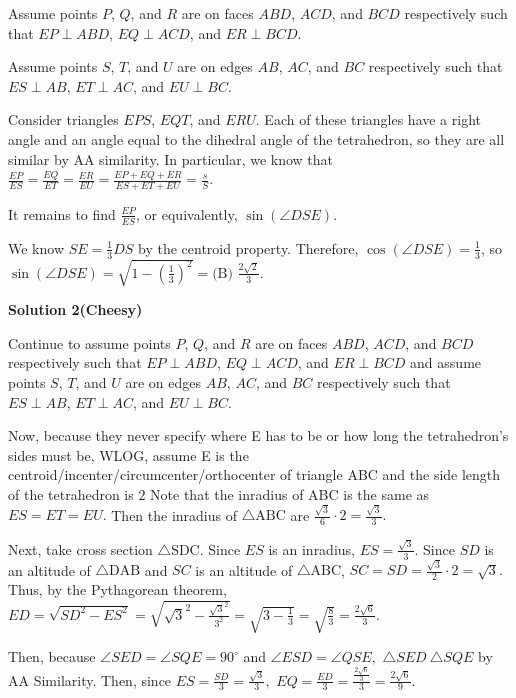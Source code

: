 \begin{enumerate}
Assume points $P$, $Q$, and $R$ are on faces $ABD$, $ACD$, and $BCD$ respectively such that $EP \perp ABD$, $EQ \perp ACD$, and $ER \perp BCD$.

 Assume points $S$, $T$, and $U$ are on edges $AB$, $AC$, and $BC$ respectively such that $ES \perp AB$, $ET \perp AC$, and $EU \perp BC$.

 Consider triangles $EPS$, $EQT$, and $ERU$. Each of these triangles have a right angle and an angle equal to the dihedral angle of the tetrahedron, so they are all similar by AA similarity. In particular, we know that $\frac{EP}{ES} = \frac{EQ}{ET} = \frac{ER}{EU} = \frac{EP+EQ+ER}{ES+ET+EU} = \frac{s}{S}$.

 It remains to find $\frac{EP}{ES}$, or equivalently, $\sin(\angle DSE)$.

 We know $SE = \frac{1}{3}DS$ by the centroid property. Therefore, $\cos(\angle DSE) = \frac{1}{3}$, so $\sin(\angle DSE) = \sqrt{1-\left(\frac{1}{3}\right)^2} = \boxed {\text{(B) }\frac{2 \sqrt{2}}{3}}$.

 



\textbf{Solution 2(Cheesy)}

Continue to assume points $P$, $Q$, and $R$ are on faces $ABD$, $ACD$, and $BCD$ respectively such that $EP \perp ABD$, $EQ \perp ACD$, and $ER \perp BCD$ and assume points $S$, $T$, and $U$ are on edges $AB$, $AC$, and $BC$ respectively such that $ES \perp AB$, $ET \perp AC$, and $EU \perp BC$. 

 Now, because they never specify where E has to be or how long the tetrahedron's sides must be, WLOG, assume E is the centroid/incenter/circumcenter/orthocenter of triangle ABC and the side length of the tetrahedron is $2$ Note that the inradius of ABC is the same as $ES=ET=EU.$ Then the inradius of $\triangle\text{ABC}$ are $\frac{\sqrt3}{6}\cdot 2=\frac{\sqrt3}{3}.$ 

 Next, take cross section $\triangle\text{SDC}.$ Since $ES$ is an inradius, $ES=\frac{\sqrt3}{3}.$ Since $SD$ is an altitude of $\triangle\text{DAB}$ and $SC$ is an altitude of $\triangle\text{ABC}$, $SC=SD=\frac{\sqrt3}{2}\cdot 2=\sqrt3.$ Thus, by the Pythagorean theorem, $ED=\sqrt{SD^2-ES^2}=\sqrt{\sqrt{3}^2-\frac{\sqrt{3}^2}{3^2}}=\sqrt{3-\frac13}=\sqrt{\frac83}=\frac{2\sqrt6}{3}.$ 

 Then, because $\angle{SED}=\angle{SQE}=90^\circ$ and $\angle{ESD}=\angle{QSE},$ $\triangle{SED}~\triangle{SQE}$ by AA Similarity. Then, since $ES=\frac{SD}3=\frac{\sqrt3}3,$ $EQ=\frac{ED}3=\frac{\frac{2\sqrt6}3}{3}=\frac{2\sqrt6}9.$ 


\end{enumerate}
